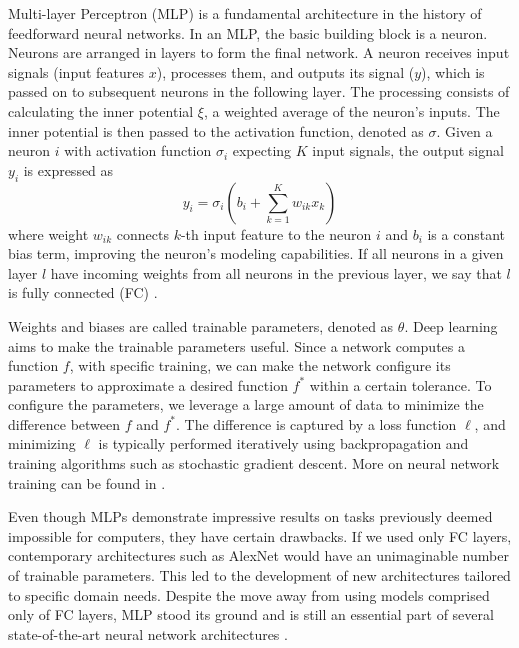 Multi-layer Perceptron (MLP) is a fundamental architecture in the history of feedforward neural networks.
In an MLP, the basic building block is a neuron.
Neurons are arranged in layers to form the final network.
A neuron receives input signals (input features $x$), processes them, and outputs its signal ($y$), which is passed on to subsequent neurons in the following layer.
The processing consists of calculating the inner potential $\xi$, a weighted average of the neuron's inputs.
The inner potential is then passed to the activation function, denoted as $\sigma$. 
Given a neuron $i$ with activation function $\sigma_i$ expecting $K$ input signals, the output signal $y_i$ is expressed as
\begin{equation}
    y_i = \sigma_i(b_i + \sum_{k=1}^K w_{ik}x_k)
\end{equation}
where weight $w_{ik}$ connects $k$-th input feature to the neuron $i$ and $b_i$ is a constant bias term, improving the neuron's modeling capabilities.
If all neurons in a given layer $l$ have incoming weights from all neurons in the previous layer, we say that $l$ is fully connected (FC) \cite{goodfellow}.

Weights and biases are called trainable parameters, denoted as $\theta$.
Deep learning aims to make the trainable parameters useful.
Since a network computes a function $f$, with specific training, we can make the network configure its parameters to approximate a desired function $f^*$ within a certain tolerance.
To configure the parameters, we leverage a large amount of data to minimize the difference between $f$ and $f^*$.
The difference is captured by a loss function $\ell$, and minimizing $\ell$ is typically performed iteratively using backpropagation and training algorithms such as stochastic gradient descent.
More on neural network training can be found in \cite{goodfellow}.

Even though MLPs demonstrate impressive results on tasks previously deemed impossible for computers, they have certain drawbacks.
If we used only FC layers, contemporary architectures such as AlexNet \cite{alexnet} would have an unimaginable number of trainable parameters.
This led to the development of new architectures tailored to specific domain needs.
Despite the move away from using models comprised only of FC layers, MLP stood its ground and is still an essential part of several state-of-the-art neural network architectures \cite{alexnet}.


